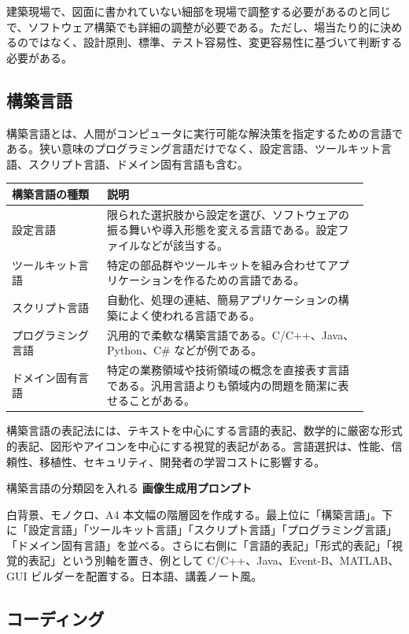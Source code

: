\documentclass[a4paper,11pt,ja=standard,xelatex]{bxjsarticle}
\begin{document}
建築現場で、図面に書かれていない細部を現場で調整する必要があるのと同じで、ソフトウェア構築でも詳細の調整が必要である。ただし、場当たり的に決めるのではなく、設計原則、標準、テスト容易性、変更容易性に基づいて判断する必要がある。

\subsection{構築言語}

構築言語とは、人間がコンピュータに実行可能な解決策を指定するための言語である。狭い意味のプログラミング言語だけでなく、設定言語、ツールキット言語、スクリプト言語、ドメイン固有言語も含む。

\begin{longtable}{L{0.24\linewidth}L{0.66\linewidth}}
\toprule
\textbf{構築言語の種類} & \textbf{説明} \\
\midrule
設定言語 & 限られた選択肢から設定を選び、ソフトウェアの振る舞いや導入形態を変える言語である。設定ファイルなどが該当する。 \\
ツールキット言語 & 特定の部品群やツールキットを組み合わせてアプリケーションを作るための言語である。 \\
スクリプト言語 & 自動化、処理の連結、簡易アプリケーションの構築によく使われる言語である。 \\
プログラミング言語 & 汎用的で柔軟な構築言語である。C/C++、Java、Python、C\# などが例である。 \\
ドメイン固有言語 & 特定の業務領域や技術領域の概念を直接表す言語である。汎用言語よりも領域内の問題を簡潔に表せることがある。 \\
\bottomrule
\end{longtable}

構築言語の表記法には、テキストを中心にする言語的表記、数学的に厳密な形式的表記、図形やアイコンを中心にする視覚的表記がある。言語選択は、性能、信頼性、移植性、セキュリティ、開発者の学習コストに影響する。

\begin{todobox}{構築言語の分類図を入れる}
\textbf{画像生成用プロンプト}

白背景、モノクロ、A4 本文幅の階層図を作成する。最上位に「構築言語」。下に「設定言語」「ツールキット言語」「スクリプト言語」「プログラミング言語」「ドメイン固有言語」を並べる。さらに右側に「言語的表記」「形式的表記」「視覚的表記」という別軸を置き、例として C/C++、Java、Event-B、MATLAB、GUI ビルダーを配置する。日本語、講義ノート風。
\end{todobox}

\subsection{コーディング}
\end{document}
